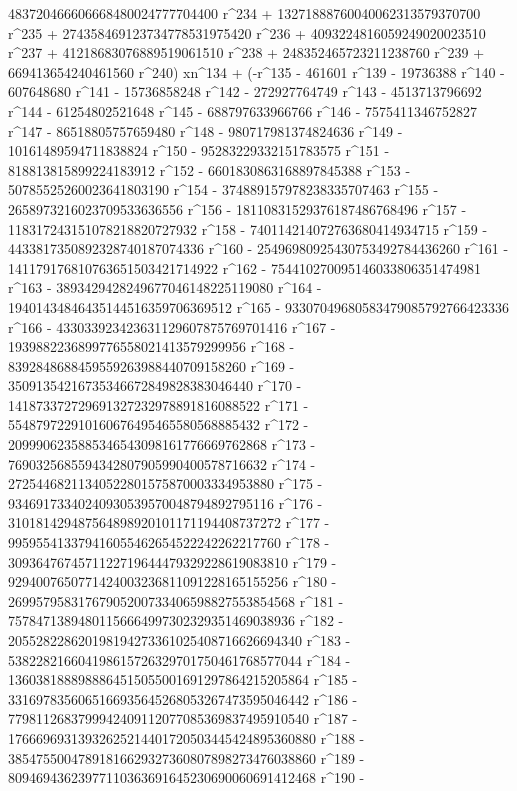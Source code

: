        483720466606668480024777704400 r^234 + 
       13271888760040062313579370700 r^235 + 
       274358469123734778531975420 r^236 + 
       4093224816059249020023510 r^237 + 
       41218683076889519061510 r^238 + 248352465723211238760 r^239 + 
       669413654240461560 r^240) xn^134 + (-r^135 - 461601 r^139 - 
       19736388 r^140 - 607648680 r^141 - 15736858248 r^142 - 
       272927764749 r^143 - 4513713796692 r^144 - 
       61254802521648 r^145 - 688797633966766 r^146 - 
       7575411346752827 r^147 - 86518805757659480 r^148 - 
       980717981374824636 r^149 - 10161489594711838824 r^150 - 
       95283229332151783575 r^151 - 818813815899224183912 r^152 - 
       6601830863168897845388 r^153 - 50785525260023641803190 r^154 - 
       374889157978238335707463 r^155 - 
       2658973216023709533636556 r^156 - 
       18110831529376187486768496 r^157 - 
       118317243151078218820727932 r^158 - 
       740114214072763680414934715 r^159 - 
       4433817350892328740187074336 r^160 - 
       25496980925430753492784436260 r^161 - 
       141179176810763651503421714922 r^162 - 
       754410270095146033806351474981 r^163 - 
       3893429428249677046148225119080 r^164 - 
       19401434846435144516359706369512 r^165 - 
       93307049680583479085792766423336 r^166 - 
       433033923423631129607875769701416 r^167 - 
       1939882236899776558021413579299956 r^168 - 
       8392848688459559263988440709158260 r^169 - 
       35091354216735346672849828383046440 r^170 - 
       141873372729691327232978891816088522 r^171 - 
       554879722910160676495465580568885432 r^172 - 
       2099906235885346543098161776669762868 r^173 - 
       7690325685594342807905990400578716632 r^174 - 
       27254468211340522801575870003334953880 r^175 - 
       93469173340240930539570048794892795116 r^176 - 
       310181429487564898920101171194408737272 r^177 - 
       995955413379416055462654522242262217760 r^178 - 
       3093647674571122719644479329228619083810 r^179 - 
       9294007650771424003236811091228165155256 r^180 - 
       26995795831767905200733406598827553854568 r^181 - 
       75784713894801156664997302329351469038936 r^182 - 
       205528228620198194273361025408716626694340 r^183 - 
       538228216604198615726329701750461768577044 r^184 - 
       1360381888988864515055001691297864215205864 r^185 - 
       3316978356065166935645268053267473595046442 r^186 - 
       7798112683799942409112077085369837495910540 r^187 - 
       17666969313932625214401720503445424895360880 r^188 - 
       38547550047891816629327360807898273476038860 r^189 - 
       80946943623977110363691645230690060691412468 r^190 - 
